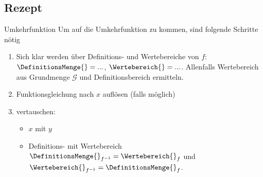 \subsection{Rezept}
\begin{rezept}{Umkehrfunktion}{}
  Um auf die Umkehrfunktion zu kommen, sind folgende Schritte nötig
  \begin{enumerate}
  \item Sich klar werden über Definitions- und Wertebereiche von $f$:
    $\DefinitionsMenge{} =  ...$, $\Wertebereich{} = ...$. Allenfalls Wertebereich aus Grundmenge $\mathcal{G}$ und Definitionsbereich ermitteln.
  \item Funktionsgleichung nach $x$ auf\/lösen (falls möglich)
  \item vertauschen:
    \begin{itemize}
  \item $x$ mit $y$ 
  \item Definitions- mit Wertebereich\\

      $\DefinitionsMenge{}_{f^{-1}} = \Wertebereich{}_f$ und  \\

      $\Wertebereich{}_{f^{-1}} = \DefinitionsMenge{}_f$.
      \end{itemize}
    \end{enumerate} 
  \end{rezept}
\newpage%
